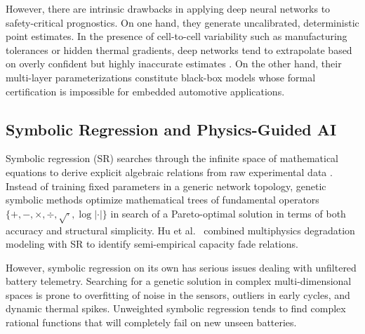 \documentclass[a4paper,fleqn]{cas-sc}
\begin{document}
However, there are intrinsic drawbacks in applying deep neural networks to safety-critical prognostics. On one hand, they generate uncalibrated, deterministic point estimates. In the presence of cell-to-cell variability such as manufacturing tolerances or hidden thermal gradients, deep networks tend to extrapolate based on overly confident but highly inaccurate estimates \cite{park2025feature, sun2024interpretable}. On the other hand, their multi-layer parameterizations constitute black-box models whose formal certification is impossible for embedded automotive applications.

\subsection{Symbolic Regression and Physics-Guided AI}
Symbolic regression (SR) searches through the infinite space of mathematical equations to derive explicit algebraic relations from raw experimental data \cite{cranmer2023pysr}. Instead of training fixed parameters in a generic network topology, genetic symbolic methods optimize mathematical trees of fundamental operators $\{+, -, \times, \div, \sqrt{\cdot}, \log|\cdot|\}$ in search of a Pareto-optimal solution in terms of both accuracy and structural simplicity. Hu et al.~\cite{hu2026multiphysics} combined multiphysics degradation modeling with SR to identify semi-empirical capacity fade relations.

However, symbolic regression on its own has serious issues dealing with unfiltered battery telemetry. Searching for a genetic solution in complex multi-dimensional spaces is prone to overfitting of noise in the sensors, outliers in early cycles, and dynamic thermal spikes. Unweighted symbolic regression tends to find complex rational functions that will completely fail on new unseen batteries.
\end{document}
